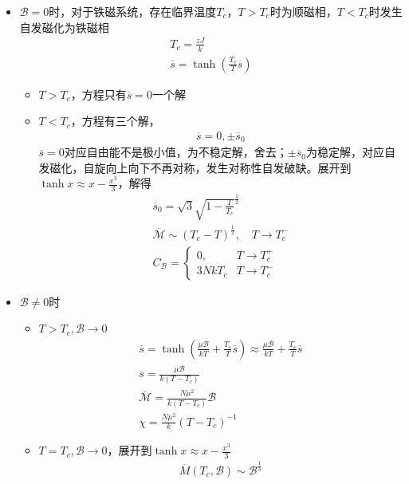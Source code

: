 \begin{itemize}
    \item $\mathscr{B} = 0$时，对于铁磁系统，存在临界温度$T_c$，$T>T_c$时为顺磁相，$T<T_c$时发生自发磁化为铁磁相
    \begin{gather*}
        T_c = \frac{zJ}{k}
        \\
        \overline{s} = \tanh \left(\frac{T_c}{T} \overline{s}\right)
    \end{gather*}
    \begin{itemize}
        \item $T>T_c$，方程只有$\overline{s} = 0$一个解
        \item $T<T_c$，方程有三个解，
        \begin{gather*}
            \overline{s} = 0, \pm \overline{s}_0
        \end{gather*}
        $\overline{s} = 0$对应自由能不是极小值，为不稳定解，舍去；$\pm \overline{s}_0$为稳定解，对应自发磁化，自旋向上向下不再对称，发生对称性自发破缺。展开到$\tanh x \approx x - \frac{x^3}{3}$，解得
        \begin{gather*}
            \overline{s}_0 = \sqrt{3} \sqrt{1 - \frac{T}{T_c}}^{\frac{1}{2}}
            \\
            \overline{\mathscr{M}} \sim (T_c - T)^{\frac{1}{2}},\quad T \to T_c^{-}
            \\
            C_{\mathscr{B}} = \begin{cases}
                0, & T \to T_c^{+}
                \\
                3NkT_c & T \to T_c^{-}
            \end{cases} 
        \end{gather*}
    \end{itemize}
    \item $\mathscr{B} \neq 0$时
    \begin{itemize}
        \item $T>T_c, \mathscr{B} \to 0$
        \begin{gather*}
            \overline{s} = \tanh \left(\frac{\mu \mathscr{B}}{kT}+\frac{T_c}{T} \overline{s}\right) \approx \frac{\mu \mathscr{B}}{kT} + \frac{T_c}{T} \overline{s}
            \\
            \overline{s} = \frac{\mu \mathscr{B}}{k(T - T_c)}
            \\
            \overline{\mathscr{M}} = \frac{N \mu^2}{k(T - T_c)} \mathscr{B}
            \\
            \chi = \frac{N \mu^2}{k} (T-T_c)^{-1}
        \end{gather*}
        \item $T = T_c, \mathscr{B} \to 0$，展开到$\tanh x \approx x - \frac{x^3}{3}$
        \begin{gather*}
            \overline{M}(T_c, \mathscr{B}) \sim \mathscr{B}^{\frac{1}{3}}
        \end{gather*}
    \end{itemize}
\end{itemize}

